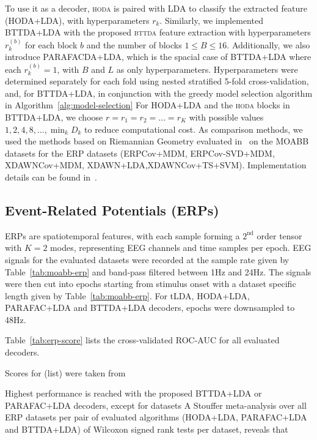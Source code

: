 \documentclass[twocolumn]{article}
\begin{document}
To use it as a decoder, \textsc{hoda} is paired with LDA to classify the
extracted feature (HODA+LDA), with hyperparameters $r_k$.
Similarly, we implemented BTTDA+LDA with the proposed \textsc{bttda} feature
extraction with hyperparameters $r_k^{(b)}$ for each block $b$ and the number of blocks
$1\leq B\leq16$.
Additionally, we also introduce PARAFACDA+LDA, which is the spacial case of
BTTDA+LDA where each $r_k^{(b)}=1$, with $B$ and $L$ as only hyperparameters.
Hyperparameters were determined separately for each fold using nested
stratified 5-fold cross-validation, and, for BTTDA+LDA, in conjunction with the
greedy model selection algorithm in Algorithm~\ref{alg:model-selection}
For HODA+LDA and the \textsc{hoda} blocks in BTTDA+LDA, we choose
$r=r_1=r_2=\ldots=r_K$ with possible values $1,2,4,8,\ldots,\min_kD_k$
to reduce computational cost.
As comparison methods, we used the methods based on
Riemannian Geometry evaluated in~\cite{Chevallier2024} on
the MOABB datasets for the ERP datasets (ERPCov+MDM, ERPCov-SVD+MDM,
XDAWNCov+MDM, XDAWN+LDA,XDAWNCov+TS+SVM).
Implementation details can be found in~\cite{Chevallier2024}.

\subsection{Event-Related Potentials (ERPs)}
ERPs are spatiotemporal features, with each sample forming a $2^\text{nd}$
order tensor with $K=2$ modes, representing EEG channels and time samples
per epoch.
EEG signals for the evaluated datasets were recorded at the sample rate given
by Table~\ref{tab:moabb-erp} and band-pass filtered between 1Hz
and 24Hz.
The signals were then cut into epochs starting from stimulus onset with a
dataset specific length given by Table~\ref{tab:moabb-erp}.
For tLDA, HODA+LDA, PARAFAC+LDA and BTTDA+LDA decoders, epochs were downsampled to 48Hz.

Table~\ref{tab:erp-score} lists the cross-validated ROC-AUC for all evaluated
decoders.
\begin{table*}[t]
  \footnotesize
  \centering
  
  \caption{Scores for (list) were taken from \cite{Chevallier2024}}
  \label{tab:erp-score}
\end{table*}
Highest performance is reached with the proposed BTTDA+LDA or PARAFAC+LDA
decoders, except for datasets
A Stouffer meta-analysis over all ERP datasets per pair of evaluated algorithms
(HODA+LDA, PARAFAC+LDA and BTTDA+LDA) of Wilcoxon signed rank tests per dataset,
reveals that
\end{document}
